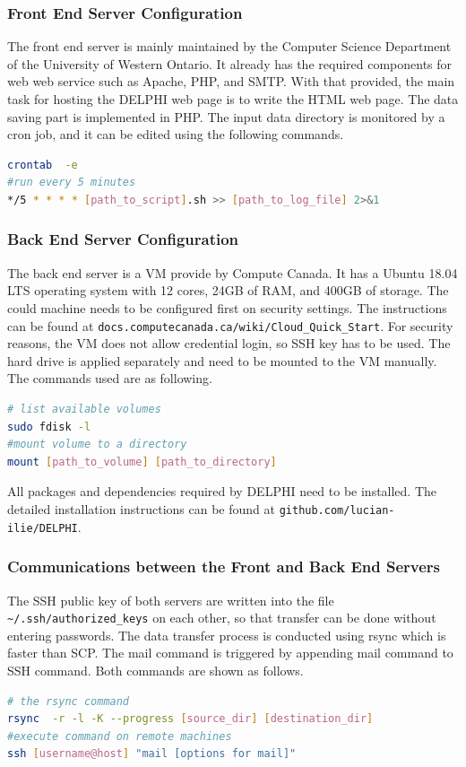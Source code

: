 \subsubsection{Front End Server Configuration}
The front end server is mainly maintained by the Computer Science Department of the University of Western Ontario. It already has the required components for web web service such as Apache, PHP, and SMTP. With that provided, the main task for hosting the DELPHI web page is to write the HTML web page. The data saving part is implemented in PHP. The input data directory is monitored by a cron job, and it can be edited using the following commands.
\begin{lstlisting}[language=bash,frame=single]
crontab  -e
#run every 5 minutes
*/5 * * * * [path_to_script].sh >> [path_to_log_file] 2>&1
\end{lstlisting}

\subsubsection{Back End Server Configuration}
The back end server is a VM provide by Compute Canada. It has a Ubuntu 18.04 LTS operating system with 12 cores, 24GB of RAM, and 400GB of storage. The could machine needs to be configured first on security settings. The instructions can be found at \texttt{docs.computecanada.ca/wiki/Cloud\_Quick\_Start}. For security reasons, the VM does not allow credential login, so SSH key has to be used. The hard drive is applied separately and need to be mounted to the VM manually. The commands used are as following.
\begin{lstlisting}[language=bash,frame=single]
# list available volumes
sudo fdisk -l
#mount volume to a directory
mount [path_to_volume] [path_to_directory]
\end{lstlisting}

All packages and dependencies required by DELPHI need to be installed. The detailed installation instructions can be found at \texttt{github.com/lucian-ilie/DELPHI}.

\subsubsection{Communications between the Front and Back End Servers}
The SSH public key of both servers are written into the file
\texttt{\textasciitilde{}/.ssh/authorized\_keys} on each other, so that transfer can be done without entering passwords. The data transfer process is conducted using rsync which is faster than SCP. The mail command is triggered by appending mail command to SSH command. Both commands are shown as follows.
\begin{lstlisting}[language=bash,frame=single]
# the rsync command
rsync  -r -l -K --progress [source_dir] [destination_dir]
#execute command on remote machines
ssh [username@host] "mail [options for mail]"
\end{lstlisting}

